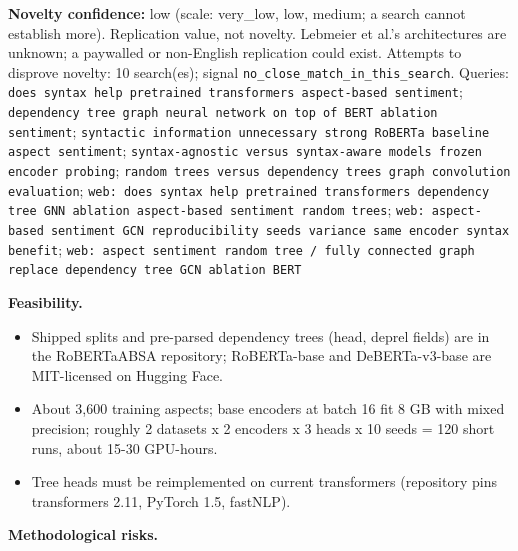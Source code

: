\documentclass[11pt,a4paper]{article}
\begin{document}
\textbf{Novelty confidence:} low (scale: very\_low, low, medium; a search cannot establish more). Replication value, not novelty. Lebmeier et al.'s architectures are unknown; a paywalled or non-English replication could exist.
Attempts to disprove novelty: 10 search(es); signal \texttt{no\_close\_match\_in\_this\_search}. Queries: \texttt{does syntax help pretrained transformers aspect-based sentiment}; \texttt{dependency tree graph neural network on top of BERT ablation sentiment}; \texttt{syntactic information unnecessary strong RoBERTa baseline aspect sentiment}; \texttt{syntax-agnostic versus syntax-aware models frozen encoder probing}; \texttt{random trees versus dependency trees graph convolution evaluation}; \texttt{web: does syntax help pretrained transformers dependency tree GNN ablation aspect-based sentiment random trees}; \texttt{web: aspect-based sentiment GCN reproducibility seeds variance same encoder syntax benefit}; \texttt{web: aspect sentiment random tree / fully connected graph replace dependency tree GCN ablation BERT}

\textbf{Feasibility.}
\begin{itemize}
\item [V] Shipped splits and pre-parsed dependency trees (head, deprel fields) are in the RoBERTaABSA repository; RoBERTa-base and DeBERTa-v3-base are MIT-licensed on Hugging Face.
\item [E] About 3,600 training aspects; base encoders at batch 16 fit 8 GB with mixed precision; roughly 2 datasets x 2 encoders x 3 heads x 10 seeds = 120 short runs, about 15-30 GPU-hours.
\item [V] Tree heads must be reimplemented on current transformers (repository pins transformers 2.11, PyTorch 1.5, fastNLP).
\end{itemize}

\textbf{Methodological risks.}
\end{document}
